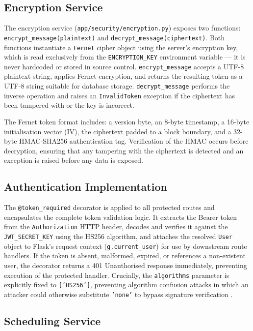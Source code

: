 \documentclass[12pt, a4paper]{article}
\begin{document}
\subsection{Encryption Service}

The encryption service (\texttt{app/security/encryption.py}) exposes two functions: \texttt{encrypt\_message(plaintext)} and \texttt{decrypt\_message(ciphertext)}. Both functions instantiate a \texttt{Fernet} cipher object using the server's encryption key, which is read exclusively from the \texttt{ENCRYPTION\_KEY} environment variable — it is never hardcoded or stored in source control. \texttt{encrypt\_message} accepts a UTF-8 plaintext string, applies Fernet encryption, and returns the resulting token as a UTF-8 string suitable for database storage. \texttt{decrypt\_message} performs the inverse operation and raises an \texttt{InvalidToken} exception if the ciphertext has been tampered with or the key is incorrect.

The Fernet token format includes: a version byte, an 8-byte timestamp, a 16-byte initialisation vector (IV), the ciphertext padded to a block boundary, and a 32-byte HMAC-SHA256 authentication tag. Verification of the HMAC occurs before decryption, ensuring that any tampering with the ciphertext is detected and an exception is raised before any data is exposed.

\subsection{Authentication Implementation}

The \texttt{@token\_required} decorator is applied to all protected routes and encapsulates the complete token validation logic. It extracts the Bearer token from the \texttt{Authorization} HTTP header, decodes and verifies it against the \texttt{JWT\_SECRET\_KEY} using the HS256 algorithm, and attaches the resolved \texttt{User} object to Flask's request context (\texttt{g.current\_user}) for use by downstream route handlers. If the token is absent, malformed, expired, or references a non-existent user, the decorator returns a 401 Unauthorised response immediately, preventing execution of the protected handler. Crucially, the \texttt{algorithms} parameter is explicitly fixed to \texttt{['HS256']}, preventing algorithm confusion attacks in which an attacker could otherwise substitute \texttt{'none'} to bypass signature verification \cite{fu2022}.

\subsection{Scheduling Service}
\end{document}

